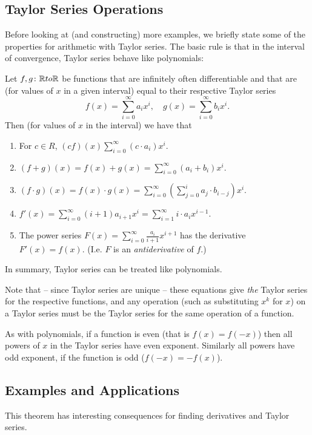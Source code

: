 \subsection{Taylor Series Operations}

Before looking at (and constructing) more examples, we briefly state some
of the properties for arithmetic with Taylor series. The basic rule is that
in the interval of convergence, Taylor series behave like polynomials:

\begin{thm}
Let $f,g\colon{\mathbb R} to{\mathbb R}$ be functions that are infinitely often differentiable
and that are (for values of $x$ in a given interval) equal to their
respective Taylor series
\[
f(x)=\sum_{i=0}^\infty a_i x^i,\quad
g(x)=\sum_{i=0}^\infty b_i x^i.
\]
Then (for values of $x$ in the interval) we have that
\begin{enumerate}
\item For $c\in R$, $(cf)(x)\sum_{i=0}^\infty (c\cdot a_i)x^i$.
\item $(f+g)(x)=f(x)+g(x)=\sum_{i=0}^\infty (a_i+b_i) x^i$.
\item $(f\cdot g)(x)=f(x)\cdot g(x)=\sum_{i=0}^\infty \left(\sum_{j=0}^i
a_j\cdot b_{i-j}\right) x^i$.
\item $f'(x)=\sum_{i=0}^\infty (i+1)a_{i+1}x^i
=\sum_{i=1}^\infty i\cdot a_i x^{i-1}$.
\item The power series $F(x)=\sum_{i=0}^\infty \frac{a_i}{i+1} x^{i+1}$ has
the derivative $F'(x)=f(x)$. (I.e. $F$ is an {\em antiderivative} of $f$.)
\end{enumerate}
In summary, Taylor series can be treated like polynomials.
\end{thm}
Note that -- since Taylor series are unique -- these equations give {\em the}
Taylor series for the respective functions, and any operation (such as
substituting $x^k$ for $x$) on a Taylor series must be the Taylor series for
the same operation of a function.
\medskip

As with polynomials, if a function is even (that is $f(x)=f(-x)$) then all
powers of $x$ in the Taylor series have even exponent. Similarly all
powers have odd exponent, if the function is odd ($f(-x)=-f(x)$).

\subsection{Examples and Applications}

This theorem has interesting consequences for finding derivatives and Taylor
series.

